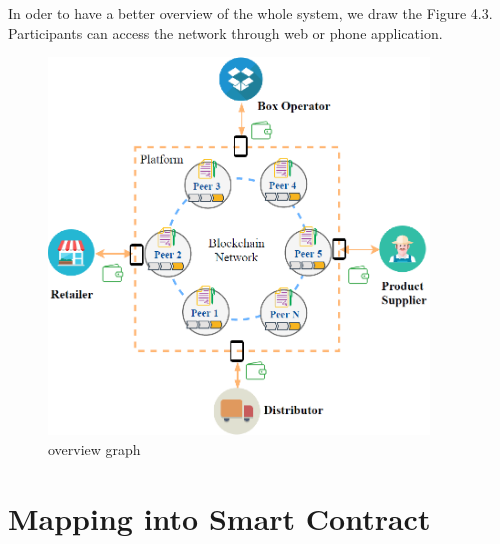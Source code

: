 In oder to have a better overview of the whole system, we draw the Figure 4.3. Participants can access the network through web or phone application.
\begin{figure}[!h]%
	\center
	\includegraphics[width=0.9\textwidth]{charts/conceptual}
	\caption{overview graph}
	\label{fig:label}
\end{figure}

\section{Mapping into Smart Contract}

